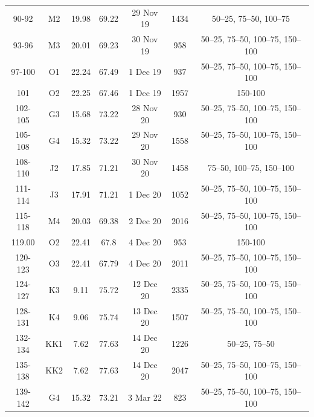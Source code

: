 \documentclass[authoryear,review,12pt]{elsarticle}
\begin{document}
\begin{table}[htbp]
{\begin{adjustwidth}{0in}{-2in}
\begin{tabular}{ccccccc}
				90-92         & M2  & 19.98      & 69.22      & 29 Nov 19                 & 1434       & 50–25, 75–50, 100–75          \\
				93-96         & M3  & 20.01      & 69.23      & 30 Nov 19                 & 958        & 50–25, 75–50, 100–75, 150–100 \\
				97-100        & O1  & 22.24      & 67.49      & 1 Dec 19                  & 937        & 50–25, 75–50, 100–75, 150–100 \\
				101        & O2  & 22.25      & 67.46      & 1 Dec 19                  & 1957       & 150-100                       \\
				\midrule
				102-105       & G3  & 15.68      & 73.22      & 28 Nov 20                 & 930        & 50–25, 75–50, 100–75, 150–100 \\
				105-108       & G4  & 15.32      & 73.22      & 29 Nov 20                 & 1558       & 50–25, 75–50, 100–75, 150–100 \\
				108-110       & J2  & 17.85      & 71.21      & 30 Nov 20                 & 1458       & 75–50, 100–75, 150–100        \\
				111-114       & J3  & 17.91      & 71.21      & 1 Dec 20                  & 1052       & 50–25, 75–50, 100–75, 150–100 \\
				115-118       & M4  & 20.03      & 69.38      & 2 Dec 20                  & 2016       & 50–25, 75–50, 100–75, 150–100 \\
				119.00        & O2  & 22.41      & 67.8       & 4 Dec 20                  & 953        & 150-100                       \\
				120-123       & O3  & 22.41      & 67.79      & 4 Dec 20                  & 2011       & 50–25, 75–50, 100–75, 150–100 \\
				124-127       & K3  & 9.11       & 75.72      & 12 Dec 20                 & 2335       & 50–25, 75–50, 100–75, 150–100 \\
				128-131       & K4  & 9.06       & 75.74      & 13 Dec 20                 & 1507       & 50–25, 75–50, 100–75, 150–100 \\
				132-134       & KK1 & 7.62       & 77.63      & 14 Dec 20                 & 1226       & 50–25, 75–50                  \\
				135-138       & KK2 & 7.62       & 77.63      & 14 Dec 20                 & 2047       & 50–25, 75–50, 100–75, 150–100 \\
				\midrule
				139-142       & G4  & 15.32      & 73.21      & 3 Mar 22                  & 823        & 50–25, 75–50, 100–75, 150–100 \\

\end{tabular}
\end{adjustwidth}}
\end{table}
\end{document}

